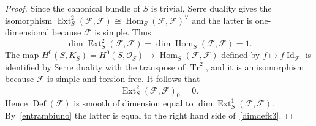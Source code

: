 \documentclass[10pt,a4paper]{amsart}
\DeclareMathOperator{\Def}{Def}
\DeclareMathOperator{\Ext}{Ext}
\DeclareMathOperator{\Hom}{Hom}
\DeclareMathOperator{\Id}{Id}
\DeclareMathOperator{\Tr}{Tr}
\def\cF{\mathcal{F}}
\def\cO{\mathcal{O}}
\begin{document}
\begin{proof}
%
Since the canonical bundle of $S$ is trivial, Serre duality gives the isomorphism $\Ext^2_S(\cF,\cF)\cong\Hom_S(\cF,\cF)^{\vee}$ and the latter is 
one-dimensional because $\cF$ is simple. Thus
%
\begin{equation}\label{entrambiuno}
%
\dim \Ext^2_S(\cF,\cF)=\dim\Hom_S(\cF,\cF)=1.
%
\end{equation}
%
The map  $H^0(S,K_S)=H^0(S,\cO_S)\to \Hom_S(\cF,\cF)$ defined by $f\mapsto f\Id_{\cF}$ is identified by Serre duality with the transpose
 of $\Tr^2$, and it is an isomorphism because $\cF$ is simple and torsion-free. It follows that  
\begin{equation}\label{oboemarcello}
%
 \Ext^2_S(\cF,\cF)_0=0.
%
\end{equation}
%
Hence 
 $\Def(\cF)$ is smooth of dimension equal to $\dim\Ext^1_S(\cF,\cF)$. By~\eqref{entrambiuno} the latter is equal to the right hand side of~\eqref{dimdefk3}.
\end{proof}
\end{document}
